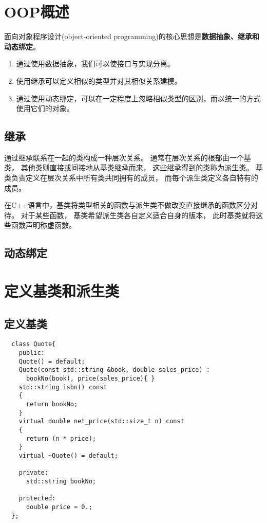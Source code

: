 \section{OOP概述}
面向对象程序设计(object-oriented programming)的核心思想是{\bfseries{数据抽象、继承和动态绑定}}。%
\begin{enumerate}
\item{通过使用数据抽象，我们可以使接口与实现分离。%
  }
\item{使用继承可以定义相似的类型并对其相似关系建模。%
  }
\item{通过使用动态绑定，可以在一定程度上忽略相似类型的区别，而以统一的方式使用它们的对象。%
  }
\end{enumerate}
\subsection{继承}
通过继承联系在一起的类构成一种层次关系。%
通常在层次关系的根部由一个基类，%
其他类则直接或间接地从基类继承而来，%
这些继承得到的类称为派生类。%
基类负责定义在层次关系中所有类共同拥有的成员，%
而每个派生类定义各自特有的成员。%
\par
{\color{red}在C++语言中，基类将类型相关的函数与派生类不做改变直接继承的函数区分对待。%
对于某些函数，%
基类希望派生类各自定义适合自身的版本，%
此时基类就将这些函数声明称虚函数。%
}
\subsection{动态绑定}

\section{定义基类和派生类}
\subsection{定义基类}
\begin{lstlisting}
  class Quote{
    public:
    Quote() = default;
    Quote(const std::string &book, double sales_price) :
      bookNo(book), price(sales_price){ }
    std::string isbn() const
    {
      return bookNo;
    }
    virtual double net_price(std::size_t n) const
    {
      return (n * price);
    }
    virtual ~Quote() = default;

    private:
      std::string bookNo;

    protected:
      double price = 0.;
  };
\end{lstlisting}
